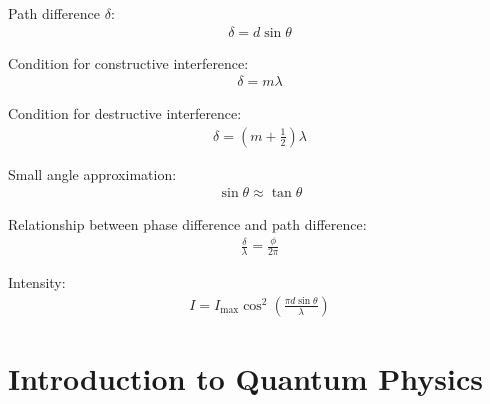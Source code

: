 \documentclass[a4paper,10pt]{report}
\begin{document}
Path difference $\delta$:
\begin{align*}
	\delta = d\sin\theta
\end{align*}

Condition for constructive interference:
\begin{align*}
	\delta = m\lambda
\end{align*}

Condition for destructive interference:
\begin{align*}
	\delta = (m+\frac{1}{2})\lambda
\end{align*}

Small angle approximation:
\begin{align*}
	\sin\theta \approx \tan\theta
\end{align*}

Relationship between phase difference and path difference:
\begin{align*}
	\frac{\delta}{\lambda} = \frac{\phi}{2\pi}
\end{align*}

Intensity:
\begin{align*}
	I = I_{\text{max}}\cos^2\left(\frac{\pi d \sin\theta}{\lambda}\right)
\end{align*}

\chapter{Introduction to Quantum Physics}
\end{document}
